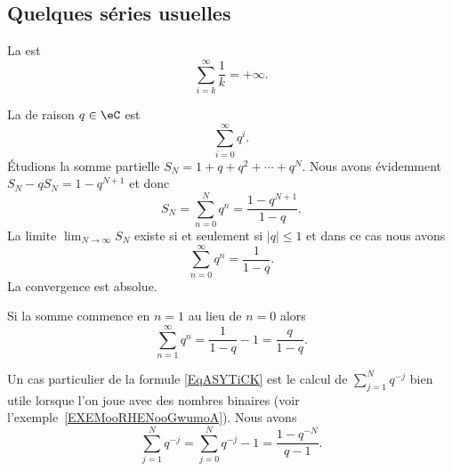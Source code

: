 \subsection{Quelques séries usuelles}
\label{SUBSECooDTYHooZjXXJf}

\begin{example}       \label{EXooDVQZooEZGoiG}
    La  est
    \begin{equation}
        \sum_{i=k}^\infty \frac{1}{ k }=+\infty.
    \end{equation}
\end{example}

\begin{example} \label{ExZMhWtJS}
    La  de raison $q \in \eC$ est
    \begin{equation}    \label{EqZQTGooIWEFxL}
        \sum_{i=0}^\infty q^i.
    \end{equation}
    Étudions la somme partielle \( S_N=1+q+q^2+\cdots +q^{N}\). Nous avons évidemment $S_N-qS_N=1-q^{N+1}$ et donc
    \begin{equation}    \label{EqASYTiCK}
        S_N=\sum_{n=0}^Nq^n=\frac{ 1-q^{N+1} }{ 1-q }.
    \end{equation}
    La limite \( \lim_{N\to \infty} S_N\) existe si et seulement si \( | q |\leq 1\) et dans ce cas nous avons
    \begin{equation}    \label{EqRGkBhrX}
        \sum_{n=0}^{\infty}q^n=\frac{ 1 }{ 1-q }.
    \end{equation}
    La convergence est absolue.

    Si la somme commence en \( n=1\) au lieu de \( n=0\) alors
    \begin{equation}        \label{EqPZOWooMdSRvY}
        \sum_{n=1}^{\infty}q^n=\frac{1}{ 1-q }-1=\frac{ q }{ 1-q }.
    \end{equation}
\end{example}

Un cas particulier de la formule \eqref{EqASYTiCK} est le calcul de \( \sum_{j=1}^{N}q^{-j}\) bien utile lorsque l'on joue avec des nombres binaires (voir l'exemple~\ref{EXEMooRHENooGwumoA}). Nous avons
\begin{equation}        \label{EQooFMBAooEJkHWT}
    \sum_{j=1}^Nq^{-j}=\sum_{j=0}^Nq^{-j}-1=\frac{ 1-q^{-N} }{ q-1 }.
\end{equation}

